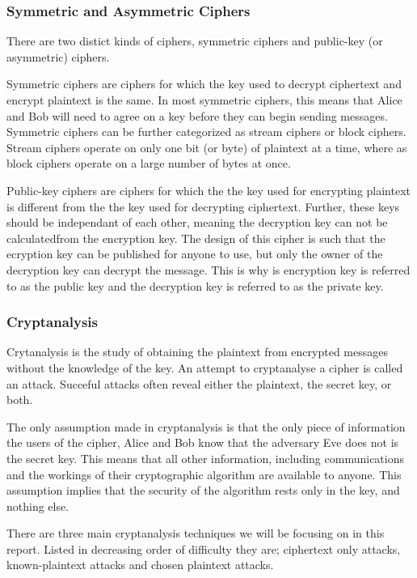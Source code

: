 \documentclass[12pt, a4paper, draft]{report}
\begin{document}
\subsubsection{Symmetric and Asymmetric Ciphers}

There are two distict kinds of ciphers, symmetric ciphers and public-key
(or asymmetric) ciphers.

Symmetric ciphers are ciphers for which the key used to decrypt ciphertext
and encrypt plaintext is the same. In most symmetric ciphers, this means
that Alice and Bob will need to agree on a key before they can begin
sending messages. Symmetric ciphers can be further categorized as stream
ciphers or block ciphers. Stream ciphers operate on only one bit (or byte)
of plaintext at a time, where as block ciphers operate on a large number
of bytes at once.

Public-key ciphers are ciphers for which the the key used for encrypting
plaintext is different from the the key used for decrypting ciphertext.
Further, these keys should be independant of each other, meaning the
decryption key can not be calculated\footnotemark from the encryption key.
The design of this cipher is such that the ecryption key can be published
for anyone to use, but only the owner of the decryption key can decrypt
the message. This is why is encryption key is referred to as the public
key and the decryption key is referred to as the private key.


\subsubsection{Cryptanalysis}

Crytanalysis is the study of obtaining the plaintext from encrypted
messages without the knowledge of the key. An attempt to cryptanalyse
a cipher is called an attack. Succeful attacks often reveal either the
plaintext, the secret key, or both.

The only assumption made in cryptanalysis is that the only piece of
information the users of the cipher, Alice and Bob know that the adversary
Eve does not is the secret key. This means that all other information,
including communications and the workings of their cryptographic algorithm
are available to anyone. This assumption implies that the security of
the algorithm rests only in the key, and nothing else.

There are three main cryptanalysis techniques we will be focusing on in
this report. Listed in decreasing order of difficulty they are; ciphertext
only attacks, known-plaintext attacks and chosen plaintext attacks.
\end{document}
